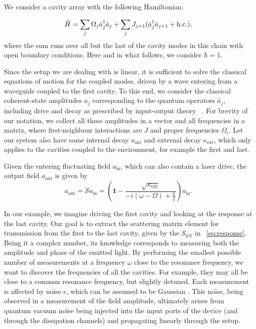 \documentclass[10pt]{iopart}  %
\begin{document}
We consider a cavity array with the following Hamiltonian:

\begin{equation}
    {\hat H}=\sum_j \Omega_j {\hat a}_j^{\dagger} {\hat a}_j +  \sum_j J_{j+1}({\hat a}_j^{\dagger} {\hat a}_{j+1} + {\rm h.c.}),
\end{equation}
where the sum runs over all but the last of the cavity modes in this chain with open boundary conditions.
Here and in what follows, we consider $\hbar =1$.

Since the setup we are dealing with is linear, it is sufficient to solve the classical equations of motion for the coupled modes, driven by a wave entering from a waveguide coupled to the first cavity.
To this end, we consider the classical coherent-state amplitudes $a_j$ corresponding to the quantum operators ${\hat a}_j$, including drive and decay as prescribed by input-output theory~ \cite{measurement}.
For brevity of our notation, we collect all these amplitudes in a vector and all frequencies in a matrix, where first-neighbour interactions are $J$ and proper frequencies $\Omega_i$.
Let our system also have some internal decay $\kappa_\text{int}$ and external decay  $\kappa_\text{ext}$, which only applies to the cavities coupled to the environment, for example the first and last.

Given the entering fluctuating field $a_\text{in}$, which can also contain a laser drive, the output field $a_\text{out}$ is given by~\cite{cohadon_quantum_2020}
\begin{equation}
    \label{eq:response}
    a_\text{out} = \mathcal S a_\text{in} =  \left( \mathbf 1 - \frac{\sqrt{\kappa_\text{ext}}}{-i(\omega - \Omega) + \frac{\kappa}{2}}  \right) a_\text{in}.
\end{equation}


In our example, we imagine driving the first cavity and looking at the response at the last cavity.
Our goal is to extract the scattering matrix element for transmission from the first to the last cavity, given by the $\mathcal S_{0N}$ in ~\eqref{eq:response}.
Being it a complex number, its knowledge corresponds to measuring both the amplitude and phase of the emitted light.
By performing the smallest possible number of measurements at a frequency $\omega$ close to the resonance frequency, we want to discover the frequencies of all the cavities.
For example, they may all be close to a common resonance frequency, but slightly detuned.
Each measurement is affected by noise $\epsilon$, which can be assumed to be Gaussian \cite{clerk_introduction_2010}.
This noise, being observed in a measurement of the field amplitude, ultimately arises from quantum vacuum noise being injected into the input ports of the device (and through the dissipation channels) and propagating linearly through the setup.
\end{document}

